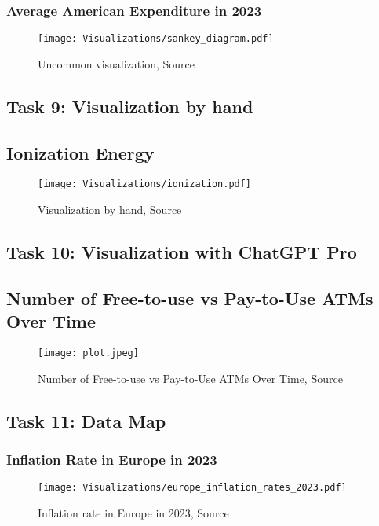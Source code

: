 \documentclass[a4paper,landscape]{article}
\begin{document}
\subsubsection{Average American Expenditure in 2023}
\begin{figure}[H]
    \centering
    \texttt{[image: Visualizations/sankey\_diagram.pdf]} %
    \caption{Uncommon visualization, Source \cite{bls2025expenditure}}
    \label{fig:americanExp}
\end{figure}

\subsection{Task 9: Visualization by hand}
\subsection{Ionization Energy}
\begin{figure}[H]
    \centering
    \texttt{[image: Visualizations/ionization.pdf]} %
    \caption{Visualization by hand, Source \cite{chemistrytalk2025ionization}}
    \label{fig:ionization}
\end{figure}


\subsection{Task 10: Visualization with ChatGPT Pro}
\subsection{Number of Free-to-use vs Pay-to-Use ATMs Over Time}
\begin{figure}[H]
    \centering
    \texttt{[image: plot.jpeg]} %
    \caption{Number of Free-to-use vs Pay-to-Use ATMs Over Time, Source \cite{gptplotATM}}
    \label{fig:GPT}
\end{figure}


\subsection{Task 11: Data Map}
\subsubsection{Inflation Rate in Europe in 2023}

\begin{figure}[H]
    \centering
    \texttt{[image: Visualizations/europe\_inflation\_rates\_2023.pdf]} %
    \caption{Inflation rate in Europe in 2023, Source \cite{eurostat2025inflation}}
    \label{fig:inflation}
\end{figure}
\end{document}
